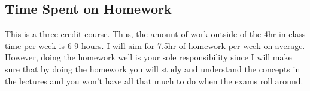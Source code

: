 \subsection*{Time Spent on Homework }

This is a three credit course. Thus, the amount of work outside of the 4hr in-class time per week is 6-9 hours. I will aim for 7.5hr of homework per week on average. However, doing the homework well is your sole responsibility since I will make sure that by doing the homework you will study and understand the concepts in the lectures and you won't have all that much to do when the exams roll around.
